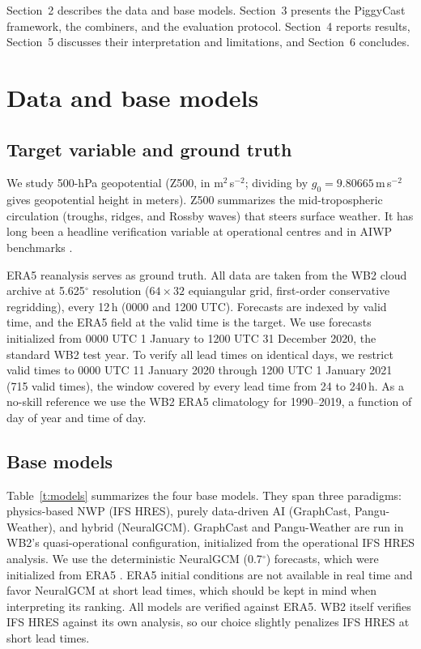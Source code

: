 \documentclass[twocol]{ametsocV6.1}
\newcommand{\units}{m$^{2}$\,s$^{-2}$}
\newcommand{\Zfive}{Z500}
\begin{document}
Section~2 describes the data and base models. Section~3 presents the PiggyCast framework, the combiners, and the evaluation protocol. Section~4 reports results, Section~5 discusses their interpretation and limitations, and Section~6 concludes.

\section{Data and base models}

\subsection{Target variable and ground truth}

We study 500-hPa geopotential (\Zfive, in \units; dividing by $g_0=9.80665$\,m\,s$^{-2}$ gives geopotential height in meters). \Zfive{} summarizes the mid-tropospheric circulation (troughs, ridges, and Rossby waves) that steers surface weather. It has long been a headline verification variable at operational centres and in AIWP benchmarks \citep{rasp2020weatherbench, rasp2024weatherbench2}.

ERA5 reanalysis \citep{hersbach2020era5} serves as ground truth. All data are taken from the WB2 cloud archive at 5.625$^\circ$ resolution ($64\times32$ equiangular grid, first-order conservative regridding), every 12\,h (0000 and 1200 UTC). Forecasts are indexed by valid time, and the ERA5 field at the valid time is the target. We use forecasts initialized from 0000 UTC 1 January to 1200 UTC 31 December 2020, the standard WB2 test year. To verify all lead times on identical days, we restrict valid times to 0000 UTC 11 January 2020 through 1200 UTC 1 January 2021 (715 valid times), the window covered by every lead time from 24 to 240\,h. As a no-skill reference we use the WB2 ERA5 climatology for 1990--2019, a function of day of year and time of day.

\subsection{Base models}

Table~\ref{t:models} summarizes the four base models. They span three paradigms: physics-based NWP (IFS HRES), purely data-driven AI (GraphCast, Pangu-Weather), and hybrid (NeuralGCM). GraphCast and Pangu-Weather are run in WB2's quasi-operational configuration, initialized from the operational IFS HRES analysis. We use the deterministic NeuralGCM (0.7$^\circ$) forecasts, which were initialized from ERA5 \citep{kochkov2024neuralgcm}.
ERA5 initial conditions are not available in real time and favor NeuralGCM at short lead times, which should be kept in mind when interpreting its ranking. All models are verified against ERA5. WB2 itself verifies IFS HRES against its own analysis, so our choice slightly penalizes IFS HRES at short lead times.
\end{document}
